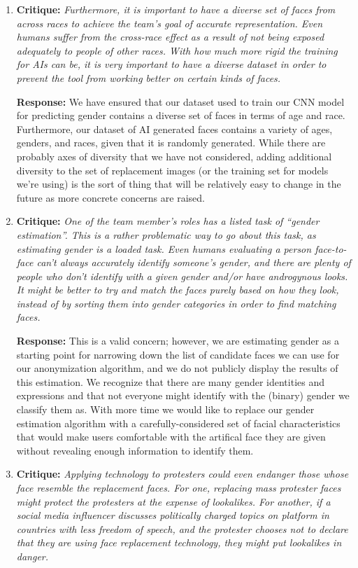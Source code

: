 \begin{enumerate}
    \item \textbf{Critique:} \textit{Furthermore, it is important to have a diverse set of faces from across races to
    achieve the team’s goal of accurate representation. Even humans suffer from the cross-race effect as a result of not being exposed adequately to people of other
    races. With how much more rigid the training for AIs can be, it is very important
    to have a diverse dataset in order to prevent the tool from working better on certain
    kinds of faces.}

    \textbf{Response:} We have ensured that our dataset used to train our CNN model for predicting gender contains a diverse set of faces
    in terms of age and race. Furthermore, our dataset of AI generated faces contains a variety of ages, genders, and races, given
    that it is randomly generated. While there are probably axes of diversity that we have not considered, adding additional diversity to the set of replacement images (or the training set for models we’re using) is the sort of thing that will be relatively easy to change in the future as more concrete concerns are raised.
    \item \textbf{Critique:} \textit{One of the team member’s roles has a listed task of “gender estimation”. This is a
    rather problematic way to go about this task, as estimating gender is a loaded task.
    Even humans evaluating a person face-to-face can’t always accurately identify
    someone’s gender, and there are plenty of people who don’t identify with a given
    gender and/or have androgynous looks. It might be better to try and match the faces
    purely based on how they look, instead of by sorting them into gender categories
    in order to find matching faces.}

    \textbf{Response:} This is a valid concern; however, we are estimating gender as a starting point for narrowing down the list of candidate faces we can use
    for our anonymization algorithm, and we do not publicly display the results of this estimation. We recognize that there are many gender identities and expressions and that not everyone might identify
    with the (binary) gender we classify them as. With more time we would like to replace our gender estimation algorithm with a carefully-considered set of facial characteristics that would make users comfortable with the artifical face they are given without revealing enough information to identify them.

    \item \textbf{Critique:} \textit{Applying technology to protesters could even endanger those whose face resemble
    the replacement faces. For one, replacing mass protester faces might protect the
    protesters at the expense of lookalikes. For another, if a social media influencer
    discusses politically charged topics on platform in countries with less freedom of
    speech, and the protester chooses not to declare that they are using face replacement
    technology, they might put lookalikes in danger.}


\end{enumerate}
